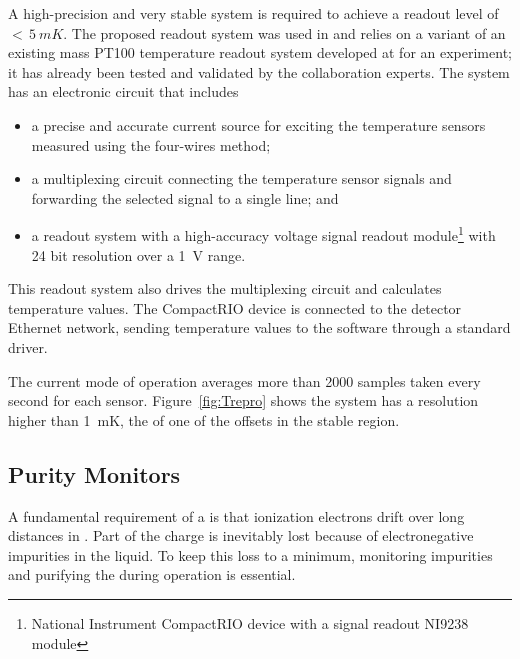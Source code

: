 A %
high-precision and very stable system is required to achieve a readout level of $<\,\SI{5}{mK}$.
The proposed readout system was used in  and relies on a variant of an existing mass PT100 temperature readout system developed at
 for an  
experiment; it has already been tested and validated by the collaboration experts. The system has an electronic circuit that includes
\begin{itemize}
\item a precise and accurate current source for exciting the temperature sensors measured using the four-wires method;
\item a multiplexing circuit connecting the temperature sensor signals and forwarding the selected signal to a single line; and 
\item a readout system  with a high-accuracy voltage signal readout module\footnote{National Instrument CompactRIO\texttrademark{} device  with a signal readout NI9238\texttrademark{} module} with 24 bit resolution over a \SI{1}{V} range.
\end{itemize}
This readout system also drives the multiplexing circuit and calculates temperature values. The CompactRIO device is connected to the detector Ethernet network, sending temperature values to the  software through a standard  driver.


The current mode of operation averages more than \num{2000} samples taken every second for each sensor. 
Figure~\ref{fig:Trepro} shows the system has a resolution higher than 
\SI{1}{mK}, the  of one of the offsets in the stable region.




\subsection{Purity Monitors}
\label{sec:fdgen-slow-cryo-purity-mon}

A fundamental requirement of a   is that ionization electrons drift over long distances in . Part of the charge is inevitably lost because of electronegative impurities in the liquid. To keep this loss to a minimum, monitoring impurities and purifying the  during operation is essential.


